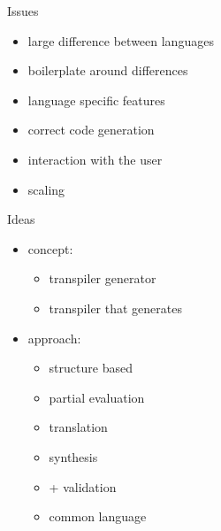 \documentclass[aspectratio=169, handout]{beamer}
\begin{document}
    \begin{frame}{Issues}
    \begin{itemize}
        \item large difference between languages \pause %
        \item boilerplate around differences\pause 
        \item language specific features\pause  %
        \item correct code generation\pause 
        \item interaction with the user
        \item scaling
    \end{itemize}
    \end{frame}
    
    \begin{frame}{Ideas}
    \begin{itemize}
    \item concept:
    \begin{itemize}
        \item transpiler generator
        \item transpiler that generates
    \end{itemize} \pause
    \item approach:
    \begin{itemize}
        \item structure based
        \item partial evaluation
        \item translation
        \item synthesis
        \item + validation
        \item common language
    \end{itemize}
    \end{itemize}
    \end{frame}
    
    
    
\end{document}
